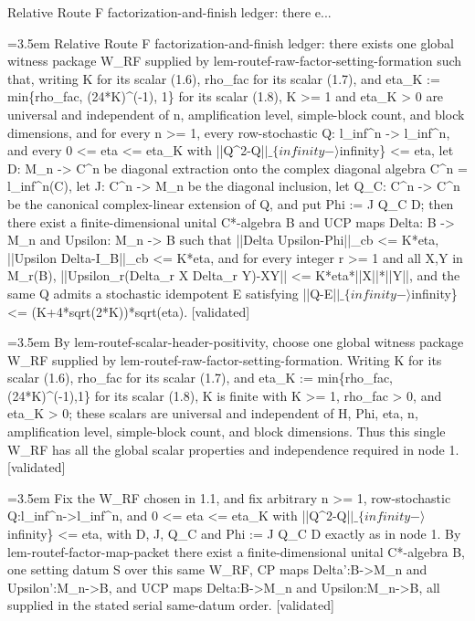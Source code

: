 \documentclass{article}
\newcommand{\step}[1]{\par\noindent\hangindent=3.5em\hangafter=1%
  \makebox[3.5em][l]{\textbf{#1.}}}
\newcommand{\steptag}[1]{\hfill{\small\textsf{[#1]}}}
\begin{document}
\begin{proofbox}{Relative Route F factorization-and-finish ledger: there e...}
\step{1} Relative Route F factorization-and-finish ledger: there exists one global witness package W\_RF supplied by lem-routef-raw-factor-setting-formation such that, writing K for its scalar (1.6), rho\_fac for its scalar (1.7), and eta\_K := min\{rho\_fac, (24*K)\textasciicircum{}(-1), 1\} for its scalar (1.8), K >= 1 and eta\_K > 0 are universal and independent of n, amplification level, simple-block count, and block dimensions, and for every n >= 1, every row-stochastic Q: l\_inf\textasciicircum{}n -> l\_inf\textasciicircum{}n, and every 0 <= eta <= eta\_K with ||Q\textasciicircum{}2-Q|$|\_\{infinity-\rangle$infinity\} <= eta, let D: M\_n -> C\textasciicircum{}n be diagonal extraction onto the complex diagonal algebra C\textasciicircum{}n = l\_inf\textasciicircum{}n(C), let J: C\textasciicircum{}n -> M\_n be the diagonal inclusion, let Q\_C: C\textasciicircum{}n -> C\textasciicircum{}n be the canonical complex-linear extension of Q, and put Phi := J Q\_C D; then there exist a finite-dimensional unital C*-algebra B and UCP maps Delta: B -> M\_n and Upsilon: M\_n -> B such that ||Delta Upsilon-Phi||\_cb <= K*eta, ||Upsilon Delta-I\_B||\_cb <= K*eta, and for every integer r >= 1 and all X,Y in M\_r(B), ||Upsilon\_r(Delta\_r X Delta\_r Y)-XY|| <= K*eta*||X||*||Y||, and the same Q admits a stochastic idempotent E satisfying ||Q-E|$|\_\{infinity-\rangle$infinity\} <= (K+4*sqrt(2*K))*sqrt(eta). \steptag{validated} \\[6pt]
\step{1.1} By lem-routef-scalar-header-positivity, choose one global witness package W\_RF supplied by lem-routef-raw-factor-setting-formation. Writing K for its scalar (1.6), rho\_fac for its scalar (1.7), and eta\_K := min\{rho\_fac,(24*K)\textasciicircum{}(-1),1\} for its scalar (1.8), K is finite with K >= 1, rho\_fac > 0, and eta\_K > 0; these scalars are universal and independent of H, Phi, eta, n, amplification level, simple-block count, and block dimensions. Thus this single W\_RF has all the global scalar properties and independence required in node 1. \steptag{validated} \\[4pt]
\step{1.2} Fix the W\_RF chosen in 1.1, and fix arbitrary n >= 1, row-stochastic Q:l\_inf\textasciicircum{}n->l\_inf\textasciicircum{}n, and 0 <= eta <= eta\_K with ||Q\textasciicircum{}2-Q|$|\_\{infinity-\rangle$infinity\} <= eta, with D, J, Q\_C and Phi := J Q\_C D exactly as in node 1. By lem-routef-factor-map-packet there exist a finite-dimensional unital C*-algebra B, one setting datum S over this same W\_RF, CP maps Delta':B->M\_n and Upsilon':M\_n->B, and UCP maps Delta:B->M\_n and Upsilon:M\_n->B, all supplied in the stated serial same-datum order. \steptag{validated} \\[4pt]

\end{proofbox}
\end{document}
